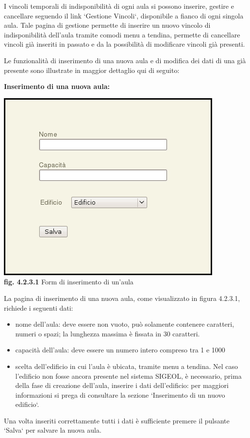 \documentclass[11pt,a4paper]{article}
\begin{document}
I vincoli temporali di indisponibilità di ogni aula si possono inserire, gestire e cancellare seguendo il link `Gestione Vincoli`, disponibile a fianco di ogni singola aula. Tale pagina di gestione permette di inserire un nuovo vincolo di indisponibilità dell'aula tramite comodi menu a tendina, permette di cancellare vincoli già inseriti in passato e da la possibilità di modificare vincoli già presenti.

Le funzionalità di inserimento di una nuova aula e di modifica dei dati di una già presente sono illustrate in maggior dettaglio qui di seguito:
\newline \newline
\begin{large}\textbf{Inserimento di una nuova aula:}\end{large}

\begin{center}
	\includegraphics[scale=0.5]{images/nuova_aula.jpg}\\
	\textbf{fig. 4.2.3.1} Form di inserimento di un'aula\\
\end{center}

La pagina di inserimento di una nuova aula, come visualizzato in figura 4.2.3.1, richiede i seguenti dati:
\begin{itemize}
 \item nome dell'aula: deve essere non vuoto, può solamente contenere caratteri, numeri o spazi; la lunghezza massima è fissata in 30 caratteri. 
 \item capacità dell'aula: deve essere un numero intero compreso tra 1 e 1000
 \item scelta dell'edificio in cui l'aula è ubicata, tramite menu a tendina. Nel caso l'edificio non fosse ancora presente nel sistema SIGEOL, è necessario, prima della fase di creazione dell'aula, inserire i dati dell'edificio: per maggiori informazioni si prega di consultare la sezione `Inserimento di un nuovo edificio`.
\end{itemize}
Una volta inseriti correttamente tutti i dati è sufficiente premere il pulsante `Salva` per salvare la nuova aula.
\end{document}
